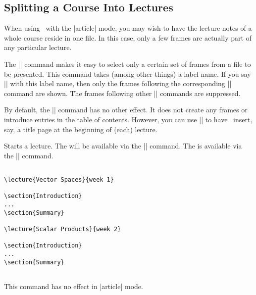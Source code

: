 \subsection{Splitting a Course Into Lectures}

When using \beamer\ with the |article| mode, you may wish to have the
lecture notes of a whole course reside in one file. In this case, only
a few frames are actually part of any particular lecture.

The |\lecture| command makes it easy to select only a certain set of
frames from a file to be presented. This command takes (among other
things) a label name. If you say || with this label
name, then only the frames following the corresponding |\lecture|
command are shown. The frames following other |\lecture| commands are
suppressed.

By default, the |\lecture| command has no other effect. It does not
create any frames or introduce entries in the table of
contents. However, you can use |\AtBeginLecture| to have \beamer\
insert, say, a title page at the beginning of (each) lecture.

\begin{command}{\lecture{}}
  Starts a lecture. The  will be available via the
  |\insertlecture| command. The \meta{short lecture name} is available
  via the |\insertshortlecture| command.

  \example
\begin{verbatim}

\lecture{Vector Spaces}{week 1}

\section{Introduction}
...
\section{Summary}

\lecture{Scalar Products}{week 2}

\section{Introduction}
...
\section{Summary}


\end{verbatim}

  \articlenote
  This command has no effect in |article| mode.
\end{command}

